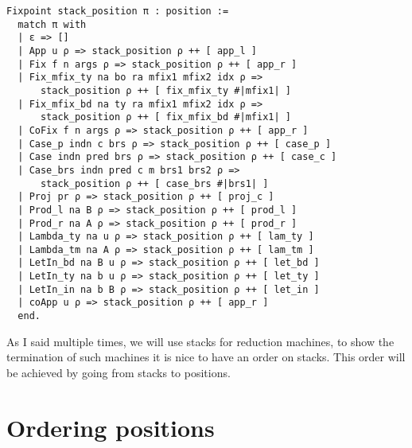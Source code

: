 \begin{verbatim}
Fixpoint stack_position π : position :=
  match π with
  | ε => []
  | App u ρ => stack_position ρ ++ [ app_l ]
  | Fix f n args ρ => stack_position ρ ++ [ app_r ]
  | Fix_mfix_ty na bo ra mfix1 mfix2 idx ρ =>
      stack_position ρ ++ [ fix_mfix_ty #|mfix1| ]
  | Fix_mfix_bd na ty ra mfix1 mfix2 idx ρ =>
      stack_position ρ ++ [ fix_mfix_bd #|mfix1| ]
  | CoFix f n args ρ => stack_position ρ ++ [ app_r ]
  | Case_p indn c brs ρ => stack_position ρ ++ [ case_p ]
  | Case indn pred brs ρ => stack_position ρ ++ [ case_c ]
  | Case_brs indn pred c m brs1 brs2 ρ =>
      stack_position ρ ++ [ case_brs #|brs1| ]
  | Proj pr ρ => stack_position ρ ++ [ proj_c ]
  | Prod_l na B ρ => stack_position ρ ++ [ prod_l ]
  | Prod_r na A ρ => stack_position ρ ++ [ prod_r ]
  | Lambda_ty na u ρ => stack_position ρ ++ [ lam_ty ]
  | Lambda_tm na A ρ => stack_position ρ ++ [ lam_tm ]
  | LetIn_bd na B u ρ => stack_position ρ ++ [ let_bd ]
  | LetIn_ty na b u ρ => stack_position ρ ++ [ let_ty ]
  | LetIn_in na b B ρ => stack_position ρ ++ [ let_in ]
  | coApp u ρ => stack_position ρ ++ [ app_r ]
  end.
\end{verbatim}

As I said multiple times, we will use stacks for reduction machines, to show the
termination of such machines it is nice to have an order on stacks. This order
will be achieved by going from stacks to positions.

\section{Ordering positions}

